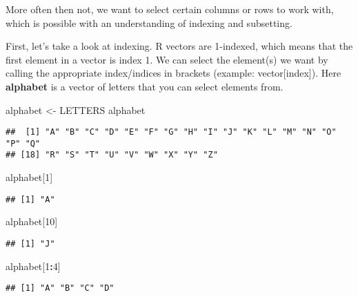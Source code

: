 \documentclass[]{article}
\newenvironment{Shaded}{\begin{snugshade}}{\end{snugshade}}
\newcommand{\DecValTok}[1]{\textcolor[rgb]{0.00,0.00,0.81}{#1}}
\newcommand{\StringTok}[1]{\textcolor[rgb]{0.31,0.60,0.02}{#1}}
\newcommand{\OperatorTok}[1]{\textcolor[rgb]{0.81,0.36,0.00}{\textbf{#1}}}
\newcommand{\NormalTok}[1]{#1}
\begin{document}
More often then not, we want to select certain columns or rows to work
with, which is possible with an understanding of indexing and
subsetting.

First, let's take a look at indexing. R vectors are 1-indexed, which
means that the first element in a vector is index 1. We can select the
element(s) we want by calling the appropriate index/indices in brackets
(example: vector{[}index{]}). Here \textbf{alphabet} is a vector of
letters that you can select elements from.

\begin{Shaded}
\begin{Highlighting}[]
\NormalTok{alphabet <-}\StringTok{ }\NormalTok{LETTERS}
\NormalTok{alphabet}
\end{Highlighting}
\end{Shaded}

\begin{verbatim}
##  [1] "A" "B" "C" "D" "E" "F" "G" "H" "I" "J" "K" "L" "M" "N" "O" "P" "Q"
## [18] "R" "S" "T" "U" "V" "W" "X" "Y" "Z"
\end{verbatim}

\begin{Shaded}
\begin{Highlighting}[]
\NormalTok{alphabet[}\DecValTok{1}\NormalTok{]}
\end{Highlighting}
\end{Shaded}

\begin{verbatim}
## [1] "A"
\end{verbatim}

\begin{Shaded}
\begin{Highlighting}[]
\NormalTok{alphabet[}\DecValTok{10}\NormalTok{]}
\end{Highlighting}
\end{Shaded}

\begin{verbatim}
## [1] "J"
\end{verbatim}

\begin{Shaded}
\begin{Highlighting}[]
\NormalTok{alphabet[}\DecValTok{1}\OperatorTok{:}\DecValTok{4}\NormalTok{]}
\end{Highlighting}
\end{Shaded}

\begin{verbatim}
## [1] "A" "B" "C" "D"
\end{verbatim}
\end{document}
